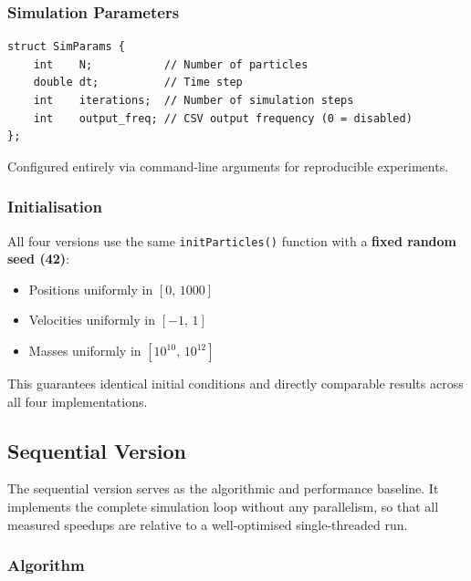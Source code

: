 ﻿\documentclass[12pt,a4paper]{article}
\begin{document}
\subsubsection*{Simulation Parameters}

\begin{lstlisting}
struct SimParams {
    int    N;           // Number of particles
    double dt;          // Time step
    int    iterations;  // Number of simulation steps
    int    output_freq; // CSV output frequency (0 = disabled)
};
\end{lstlisting}

Configured entirely via command-line arguments for reproducible experiments.

\subsubsection*{Initialisation}

All four versions use the same \texttt{initParticles()} function with a
\textbf{fixed random seed (42)}:
\begin{itemize}
    \item Positions uniformly in $[0,\,1000]$
    \item Velocities uniformly in $[-1,\,1]$
    \item Masses uniformly in $[10^{10},\,10^{12}]$
\end{itemize}

This guarantees identical initial conditions and directly comparable results
across all four implementations.

\subsection{Sequential Version}

The sequential version serves as the algorithmic and performance baseline.
It implements the complete simulation loop without any parallelism, so that
all measured speedups are relative to a well-optimised single-threaded run.

\subsubsection*{Algorithm}
\end{document}
